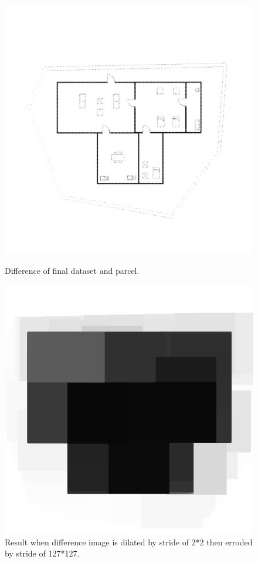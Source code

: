             \begin{figure}[h]
                \centering
                \begin{minipage}{.5\textwidth}
                    \centering
                    \includegraphics[width=.8\linewidth,frame]{img/experiment/dataset/6diff_img.jpg}
                    \caption{Difference of final dataset and parcel.}
                    \label{fig:dataset-final-difference}
                \end{minipage}%
                \hfill
                \begin{minipage}{.45\textwidth}
                    \centering
                    \includegraphics[width=.8\linewidth,frame]{img/experiment/dataset/7erode_diff_img.jpg}
                    \caption{Result when difference image is dilated by stride of 2*2 then erroded by stride of 127*127.}
                    \label{fig:dataset-final-difference-eroded}
                \end{minipage}
            \end{figure}    

